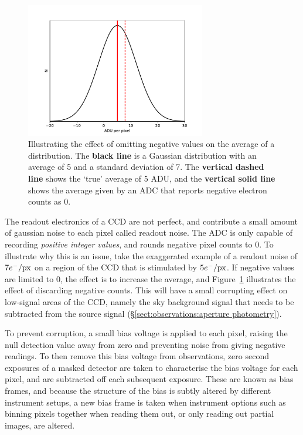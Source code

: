 \begin{figure}
    \centering
    \includegraphics[width=0.7\textwidth]{figures/observations/bias_frame_histogram.pdf}
    \caption{Illustrating the effect of omitting negative values on the average of a distribution. The {\bf black line} is a Gaussian distribution with an average of 5 and a standard deviation of 7. The {\bf vertical dashed line} shows the `true' average of 5 ADU, and the {\bf vertical solid line} shows the average given by an ADC that reports negative electron counts as 0.}
    \label{fig:observations:bias frame histogram}
\end{figure}
The readout electronics of a CCD are not perfect, and contribute a small amount of gaussian noise to each pixel called readout noise. The ADC is only capable of recording {\it positive integer values}, and rounds negative pixel counts to 0. To illustrate why this is an issue, take the exaggerated example of a readout noise of $7 e^-/{\rm px}$ on a region of the CCD that is stimulated by $5 e^-/{\rm px}$. If negative values are limited to 0, the effect is to increase the average, and Figure~\ref{fig:observations:bias frame histogram} illustrates the effect of discarding negative counts.
This will have a small corrupting effect on low-signal areas of the CCD, namely the sky background signal that needs to be subtracted from the source signal (\S\ref{sect:observations:aperture photometry}).

To prevent corruption, a small bias voltage is applied to each pixel, raising the null detection value away from zero and preventing noise from giving negative readings.
To then remove this bias voltage from observations, zero second exposures of a masked detector are taken to characterise the bias voltage for each pixel, and are subtracted off each subsequent exposure. These are known as bias frames, and because the structure of the bias is subtly altered by different instrument setups, a new bias frame is taken when instrument options such as binning pixels together when reading them out, or only reading out partial images, are altered.



